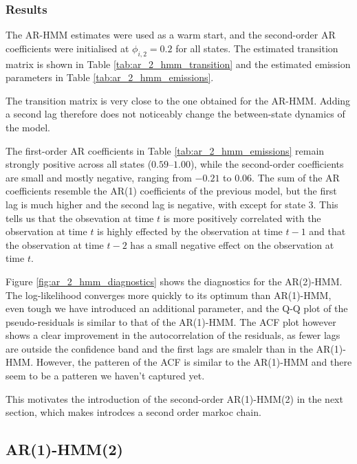\subsubsection{Results}
The AR-HMM estimates were used as a warm start, and the second-order AR coefficients were
initialised at $\phi_{i,2} = 0.2$ for all states. The estimated transition
matrix is shown in Table \ref{tab:ar_2_hmm_transition} and the estimated
emission parameters in Table \ref{tab:ar_2_hmm_emissions}.



The transition matrix is very close to the one obtained for the AR-HMM.
Adding a second lag therefore does not noticeably change the 
between-state dynamics of the model. 



The first-order AR coefficients in Table \ref{tab:ar_2_hmm_emissions} remain
strongly positive across all states ($0.59$--$1.00$), while the second-order
coefficients are small and mostly negative, ranging from $-0.21$ to $0.06$.
The sum of the AR coefficients resemble the AR(1) coefficients of the previous model, 
but the first lag is much higher and the second lag is negative, with except 
for state 3. This tells us that the obsevation at time $t$ 
is more positively correlated with the observation at time $t$ is 
highly effected by the observation at time $t-1$ and that the observation 
at time $t-2$ has a small negative effect on the observation at time $t$. 



Figure \ref{fig:ar_2_hmm_diagnostics} shows the diagnostics for the
AR(2)-HMM. The log-likelihood converges more quickly to its optimum than AR(1)-HMM, 
even tough we have introduced an additional parameter, and the
Q-Q plot of the pseudo-residuals is similar to that of the AR(1)-HMM. 
The ACF plot however shows a clear improvement in the autocorrelation 
of the residuals, as fewer lags are outside the confidence band 
and the first lags are smalelr than in the AR(1)-HMM.
However, the patteren of the ACF is similar to the AR(1)-HMM and there
seem to be a patteren we haven't captured yet. 

This motivates the introduction of the second-order AR(1)-HMM(2) in the next section, 
which makes introdces a second order markoc chain. 

\subsection{AR(1)-HMM(2)}
